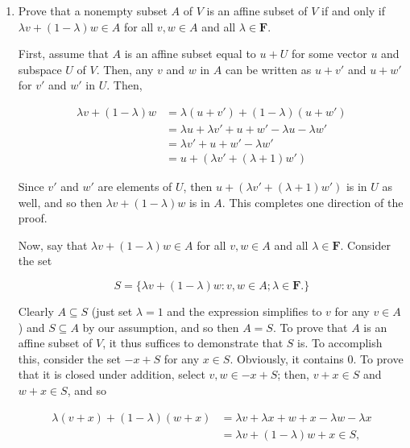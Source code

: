 \documentclass{book}
\begin{document}
\begin{enumerate}
\item Prove that a nonempty subset \(A\) of \(V\) is an affine subset of \(V\) if and only if \(\lambda v+(1-\lambda)w \in A\) for all \(v,w \in A\) and all \(\lambda \in \textbf{F}\).

First, assume that \(A\) is an affine subset equal to \(u+U\) for some vector \(u\) and subspace \(U\) of \(V\).  Then, any \(v\) and \(w\) in \(A\) can be written as \(u+v'\) and \(u+w'\) for \(v'\) and \(w'\) in \(U\).  Then,

\begin{equation*}
\begin{split}
\lambda v+(1-\lambda)w&=\lambda(u+v')+(1-\lambda)(u+w') \\
&=\lambda u + \lambda v' + u + w' - \lambda u - \lambda w' \\
&= \lambda v'+u+w'-\lambda w' \\
&= u+(\lambda v'+(\lambda+1)w')
\end{split}
\end{equation*}

Since \(v'\) and \(w'\) are elements of \(U\), then \(u+(\lambda v'+(\lambda+1)w')\) is in \(U\) as well, and so then \(\lambda v+(1-\lambda)w\) is in \(A\).  This completes one direction of the proof.

Now, say that \(\lambda v+(1-\lambda)w \in A\) for all \(v,w \in A\) and all \(\lambda \in \textbf{F}\).  Consider the set

\begin{equation*}
    S=\{\lambda v+(1-\lambda)w:v,w \in A; \lambda \in \textbf{F}.\}
\end{equation*}

Clearly \(A \subseteq S\) (just set \(\lambda =1\) and the expression simplifies to \(v\) for any \(v \in A\)) and \(S \subseteq A\) by our assumption, and so then \(A=S\).  To prove that \(A\) is an affine subset of \(V\), it thus suffices to demonstrate that \(S\) is.  To accomplish this, consider the set \(-x+S\) for any \(x \in S\).  Obviously, it contains \(0\).  To prove that it is closed under addition, select \(v,w \in -x+S\); then, \(v+x \in S\) and \(w+x \in S\), and so

\begin{equation*}
    \begin{split}
        \lambda (v+x) + (1- \lambda)(w+x) &= \lambda v + \lambda x + w + x - \lambda w - \lambda x  \\
        &= \lambda v + (1-\lambda)w + x \in S,
    \end{split}
\end{equation*}


\end{enumerate}
\end{document}
